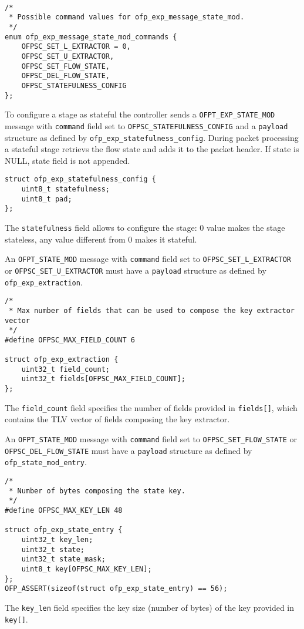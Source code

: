 \begin{verbatim}

/*
 * Possible command values for ofp_exp_message_state_mod.
 */
enum ofp_exp_message_state_mod_commands {
    OFPSC_SET_L_EXTRACTOR = 0,
    OFPSC_SET_U_EXTRACTOR,
    OFPSC_SET_FLOW_STATE,   
    OFPSC_DEL_FLOW_STATE,
    OFPSC_STATEFULNESS_CONFIG
};
\end{verbatim}
To configure a stage as stateful the controller sends a \texttt{OFPT\_EXP\_STATE\_MOD} message with \texttt{command} field set to \texttt{OFPSC\_STATEFULNESS\_CONFIG} and a \texttt{payload} structure as defined by \texttt{ofp\_exp\_statefulness\_config}. During packet processing a stateful stage retrievs the flow state and adds it to the packet header. If state is NULL, state field is not appended.

\begin{verbatim}
struct ofp_exp_statefulness_config {
    uint8_t statefulness;
    uint8_t pad;
};
\end{verbatim}
The \texttt{statefulness} field allows to configure the stage: 0 value makes the stage stateless, any value different from 0 makes it stateful.

An \texttt{OFPT\_STATE\_MOD} message with \texttt{command} field set to \texttt{OFPSC\_SET\_L\_EXTRACTOR} or \texttt{OFPSC\_SET\_U\_EXTRACTOR} must have a \texttt{payload} structure as defined by \texttt{ofp\_exp\_extraction}.

\begin{verbatim}
/*
 * Max number of fields that can be used to compose the key extractor vector
 */
#define OFPSC_MAX_FIELD_COUNT 6

struct ofp_exp_extraction {
    uint32_t field_count;
    uint32_t fields[OFPSC_MAX_FIELD_COUNT];
};
\end{verbatim}
The \texttt{field\_count} field specifies the number of fields provided in \texttt{fields[]}, which contains the TLV vector of fields composing the key extractor.



An \texttt{OFPT\_STATE\_MOD} message with \texttt{command} field set to \texttt{OFPSC\_SET\_FLOW\_STATE} or \texttt{OFPSC\_DEL\_FLOW\_STATE} must have a \texttt{payload} structure as defined by \texttt{ofp\_state\_mod\_entry}.


\begin{verbatim}
/*
 * Number of bytes composing the state key.
 */
#define OFPSC_MAX_KEY_LEN 48

struct ofp_exp_state_entry {
    uint32_t key_len;
    uint32_t state;
    uint32_t state_mask;
    uint8_t key[OFPSC_MAX_KEY_LEN];
};
OFP_ASSERT(sizeof(struct ofp_exp_state_entry) == 56);
\end{verbatim}
The \texttt{key\_len} field specifies the key size (number of bytes) of the key provided in \texttt{key[]}.

